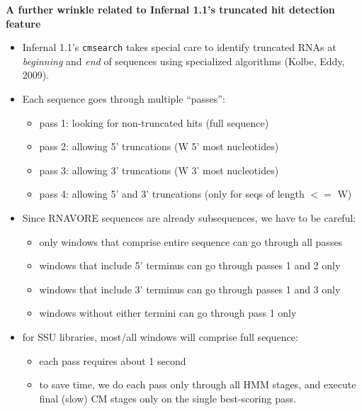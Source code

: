 \documentclass[landscape]{slides}
\begin{document}
\begin{slide}
\begin{center}
\small
\textbf{A further wrinkle related to Infernal 1.1's truncated hit
  detection feature}
\end{center}

\small
\begin{itemize}
\item Infernal 1.1's \texttt{cmsearch} takes special care to identify
  truncated RNAs at \emph{beginning} and \emph{end} of sequences using specialized
  algorithms (Kolbe, Eddy, 2009).
\item Each sequence goes through multiple ``passes'': 
  \begin {itemize}
  \item pass 1: looking for non-truncated hits (full sequence)
  \item pass 2: allowing 5' truncations (W 5' most nucleotides)
  \item pass 3: allowing 3' truncations (W 3' most nucleotides)
  \item pass 4: allowing 5' and 3' truncations (only for seqs of
    length $<=$ W)
  \end{itemize}
\item Since RNAVORE sequences are already subsequences, we have to be
  careful:
  \begin{itemize}
  \item only windows that comprise entire sequence can go through all
    passes
  \item windows that include 5' terminus can go through passes 1 and 2 only
  \item windows that include 3' terminus can go through passes 1 and 3 only
  \item windows without either termini can go through pass 1 only
  \end{itemize}
\item for SSU libraries, most/all windows will comprise full sequence:
  \begin{itemize}
  \item each pass requires about 1 second
  \item to save time, we do each pass only through all HMM stages,
    and execute final (slow) CM stages only on the single best-scoring pass.
  \end{itemize}
\end{itemize}

\vfill
\end{slide}
\end{document}
